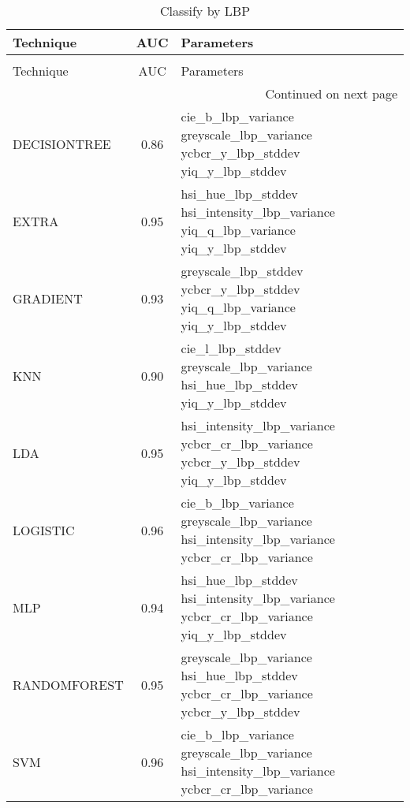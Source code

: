 \begin{longtable}{lcl}
\caption[Classify by LBP]{Classify by LBP}
\label{table:results-lbp}\\
\toprule
   Technique &  AUC &                                                                                 Parameters \\
\midrule
\endfirsthead
\caption[]{Classify by LBP} \\
\toprule
   Technique &  AUC &                                                                                 Parameters \\
\midrule
\endhead
\midrule
\multicolumn{3}{r}{{Continued on next page}} \\
\midrule
\endfoot

\bottomrule
\endlastfoot
DECISIONTREE & 0.86 &              cie\_b\_lbp\_variance greyscale\_lbp\_variance ycbcr\_y\_lbp\_stddev yiq\_y\_lbp\_stddev \\
       EXTRA & 0.95 &          hsi\_hue\_lbp\_stddev hsi\_intensity\_lbp\_variance yiq\_q\_lbp\_variance yiq\_y\_lbp\_stddev \\
    GRADIENT & 0.93 &                greyscale\_lbp\_stddev ycbcr\_y\_lbp\_stddev yiq\_q\_lbp\_variance yiq\_y\_lbp\_stddev \\
         KNN & 0.90 &                cie\_l\_lbp\_stddev greyscale\_lbp\_variance hsi\_hue\_lbp\_stddev yiq\_y\_lbp\_stddev \\
         LDA & 0.95 &       hsi\_intensity\_lbp\_variance ycbcr\_cr\_lbp\_variance ycbcr\_y\_lbp\_stddev yiq\_y\_lbp\_stddev \\
    LOGISTIC & 0.96 & cie\_b\_lbp\_variance greyscale\_lbp\_variance hsi\_intensity\_lbp\_variance ycbcr\_cr\_lbp\_variance \\
         MLP & 0.94 &       hsi\_hue\_lbp\_stddev hsi\_intensity\_lbp\_variance ycbcr\_cr\_lbp\_variance yiq\_y\_lbp\_stddev \\
RANDOMFOREST & 0.95 &         greyscale\_lbp\_variance hsi\_hue\_lbp\_stddev ycbcr\_cr\_lbp\_variance ycbcr\_y\_lbp\_stddev \\
         SVM & 0.96 & cie\_b\_lbp\_variance greyscale\_lbp\_variance hsi\_intensity\_lbp\_variance ycbcr\_cr\_lbp\_variance \\
\end{longtable}
